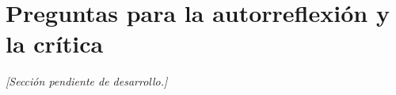 
\section{Preguntas para la autorreflexión y la crítica}

\textit{[Sección pendiente de desarrollo.]}
